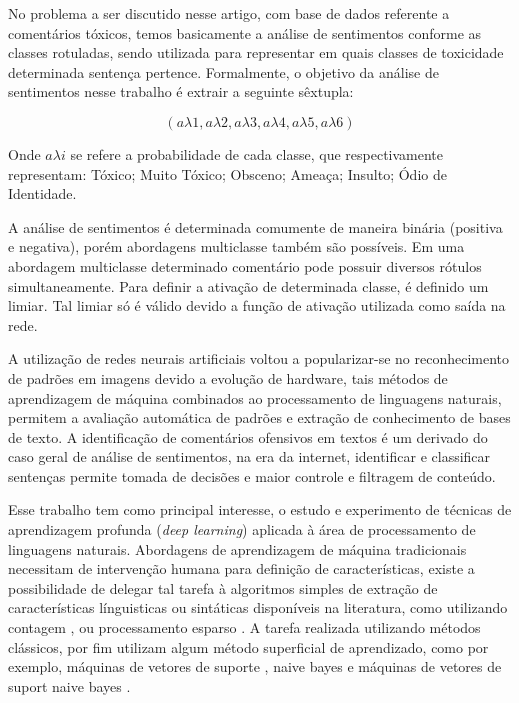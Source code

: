 \documentclass[12pt]{article}
\begin{document}
No problema a ser discutido nesse artigo, com base de dados referente a comentários tóxicos, temos basicamente a análise de sentimentos conforme as classes rotuladas, sendo utilizada para representar em quais classes de toxicidade determinada sentença pertence. Formalmente, o objetivo da análise de sentimentos nesse trabalho é extrair a seguinte sêxtupla:

\[
(a\lambda1, a\lambda2, a\lambda3, a\lambda4, a\lambda5, a\lambda6)
\]

Onde $a \lambda i$ se refere a probabilidade de cada classe, que respectivamente representam: Tóxico; Muito Tóxico; Obsceno; Ameaça; Insulto; Ódio de Identidade.

A análise de sentimentos é determinada comumente de maneira binária (positiva e negativa), porém abordagens multiclasse também são possíveis. Em uma abordagem multiclasse determinado comentário pode possuir diversos rótulos simultaneamente. Para definir a ativação de determinada classe, é definido um limiar. Tal limiar só é válido devido a função de ativação utilizada como saída na rede.

A utilização de redes neurais artificiais voltou a popularizar-se no reconhecimento de padrões em imagens devido a evolução de hardware, tais métodos de aprendizagem de máquina combinados ao processamento de linguagens naturais, permitem a avaliação automática de padrões e extração de conhecimento de bases de texto. A identificação de comentários ofensivos em textos é um derivado do caso geral de análise de sentimentos, na era da internet, identificar e classificar sentenças permite tomada de decisões e maior controle e filtragem de conteúdo. 

Esse trabalho tem como principal interesse, o estudo e experimento de técnicas de aprendizagem profunda (\textit{deep learning}) aplicada à área de processamento de linguagens naturais. Abordagens de aprendizagem de máquina tradicionais necessitam de intervenção humana para definição de características, existe a possibilidade de delegar tal tarefa à algoritmos simples de extração de características línguisticas ou sintáticas disponíveis na literatura, como utilizando contagem \cite{DBLP:journals/corr/abs-1805-04871}, ou processamento esparso \cite{ramos2003using}. A tarefa realizada utilizando métodos clássicos, por fim utilizam algum método superficial de aprendizado, como por exemplo, máquinas de vetores de suporte \cite{DBLP:journals/ml/CortesV95}, naive bayes e máquinas de vetores de suport naive bayes  \cite{wang:2012}.
\end{document}
